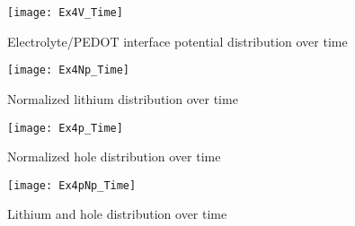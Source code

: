 \begin{landscape}
\begin{figure}[!htp]
\centering
\texttt{[image: Ex4V\_Time]}
\caption{Electrolyte/PEDOT interface potential distribution over time} 
\label{}
\end{figure}
\end{landscape}


\begin{landscape}
\begin{figure}[!htp]
\centering
\texttt{[image: Ex4Np\_Time]}
\caption{Normalized lithium distribution over time} 
\label{}
\end{figure}
\end{landscape}

\begin{landscape}
\begin{figure}[!htp]
\centering
\texttt{[image: Ex4p\_Time]}
\caption{Normalized hole distribution over time} 
\label{}
\end{figure}
\end{landscape}

\begin{landscape}
\begin{figure}[!htp]
\centering
\texttt{[image: Ex4pNp\_Time]}
\caption{Lithium and hole distribution over time} 
\label{}
\end{figure}
\end{landscape}






